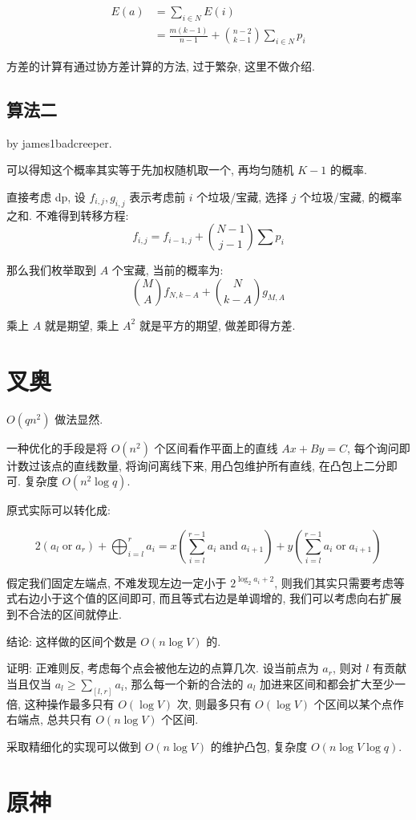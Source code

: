 \documentclass[a4paper, 12pt]{ctexart}
\begin{document}
\begin{align}
    E(a) &= \sum_{i \in N} E(i)\\
    &= \frac{m(k - 1)}{n - 1} + \binom{n - 2}{k - 1}\sum_{i \in N} p_i
\end{align}

方差的计算有通过协方差计算的方法, 过于繁杂, 这里不做介绍.

\subsection{算法二}

by james1badcreeper.

可以得知这个概率其实等于先加权随机取一个, 再均匀随机 $K - 1$ 的概率.

直接考虑 dp, 设 $f_{i,j}, g_{i, j}$ 表示考虑前 $i$ 个垃圾/宝藏, 选择 $j$ 个垃圾/宝藏, 的概率之和.
不难得到转移方程:
$$
f_{i, j} = f_{i - 1, j} + \binom{N - 1}{j - 1}\sum p_i
$$

那么我们枚举取到 $A$ 个宝藏, 当前的概率为:
$$
\binom{M}{A} f_{N, k - A} + \binom{N}{k - A} g_{M, A}
$$

乘上 $A$ 就是期望, 乘上 $A^2$ 就是平方的期望, 做差即得方差.

\section{叉奥}

$O(qn^2)$ 做法显然.

一种优化的手段是将 $O(n ^ 2)$ 个区间看作平面上的直线 $Ax + By = C$, 每个询问即计数过该点的直线数量, 将询问离线下来, 用凸包维护所有直线, 在凸包上二分即可.
复杂度 $O(n^2 \log q)$.

原式实际可以转化成:

$$
2(a_l\operatorname{or}a_r)+\bigoplus_{i=l}^ra_i=x(\sum_{i=l}^{r-1}a_i\operatorname{and}a_{i+1})+y(\sum_{i=l}^{r-1}a_i\operatorname{or}a_{i+1})
$$

假定我们固定左端点, 不难发现左边一定小于 $2^{\log_2 a_i + 2}$, 则我们其实只需要考虑等式右边小于这个值的区间即可, 而且等式右边是单调增的, 我们可以考虑向右扩展到不合法的区间就停止.

结论: 这样做的区间个数是 $O(n \log V)$ 的.

证明: 正难则反, 考虑每个点会被他左边的点算几次. 设当前点为 $a_r$, 则对 $l$ 有贡献当且仅当 $a_l \ge \sum_{[l, r]}a_i$, 那么每一个新的合法的 $a_l$ 加进来区间和都会扩大至少一倍, 这种操作最多只有 $O(\log V)$ 次, 则最多只有 $O(\log V)$ 个区间以某个点作右端点, 总共只有 $O(n \log V)$ 个区间.

采取精细化的实现可以做到 $O(n \log V)$ 的维护凸包, 复杂度 $O(n \log V \log q)$.

\section{原神}
\end{document}
